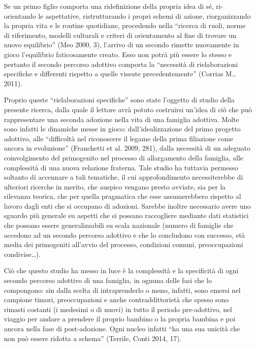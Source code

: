 \documentclass[12pt,oneside,svgnames]{memoir}
\begin{document}
Se un primo figlio comporta una ridefinizione della propria idea di sé,
ri-orientando le aspettative, ristrutturando i propri schemi di azione,
riorganizzando la propria vita e le routine quotidiane, procedendo nella
``ricerca di ruoli, norme di riferimento, modelli culturali e criteri di
orientamento al fine di trovare un nuovo equilibrio'' (Meo 2000, 3),
l'arrivo di un secondo rimette nuovamente in gioco l'equilibrio
faticosamente creato. Esso non potrà più essere lo stesso e pertanto il
secondo percorso adottivo comporta la ``necessità di rielaborazioni
specifiche e differenti rispetto a quelle vissute precedentemente''
(Corrias M., 2011).

Proprio queste ``rielaborazioni specifiche'' sono state l'oggetto di
studio della presente ricerca, dalla quale il lettore avrà potuto
costruirsi un'idea di ciò che può rappresentare una seconda adozione
nella vita di una famiglia adottiva. Molte sono infatti le dinamiche
messe in gioco: dall'idealizzazione del primo progetto adottivo, alle
``difficoltà nel riconoscere il legame della prima filiazione come
ancora in evoluzione'' (Franchetti et al. 2009, 281), dalla necessità di
un adeguato coinvolgimento del primogenito nel processo di allargamento
della famiglia, alle complessità di una nuova relazione fraterna. Tale
studio ha tuttavia permesso soltanto di accennare a tali tematiche, il
cui approfondimento necessiterebbe di ulteriori ricerche in merito, che
auspico vengano presto avviate, sia per la rilevanza teorica, che per
quella pragmatica che esse assumerebbero rispetto al lavoro dagli enti
che si occupano di adozioni. Sarebbe inoltre necessario avere uno
sguardo più generale su aspetti che si possano raccogliere mediante dati
statistici che possano essere generalizzabili su scala nazionale (numero
di famiglie che accedono ad un secondo percorso adottivo e che lo
concludono con successo, età media dei primogeniti all'avvio del
processo, condizioni comuni, preoccupazioni condivise\ldots{}).

Ciò che questo studio ha messo in luce è la complessità e la specificità
di ogni secondo percorso adottivo di una famiglia, in ognuna delle fasi
che lo compongono: sin dalla scelta di intraprenderlo o meno, infatti,
sono emersi nel campione timori, preoccupazioni e anche
contraddittorietà che spesso sono rimasti costanti (i medesimi o di
nuovi) in tutto il periodo pre-adottivo, nel viaggio per andare a
prendere il proprio bambino o la propria bambina e poi ancora nella fase
di post-adozione. Ogni nucleo infatti ``ha una sua unicità che non può
essere ridotta a schema'' (Terrile, Conti 2014, 17).
\end{document}
